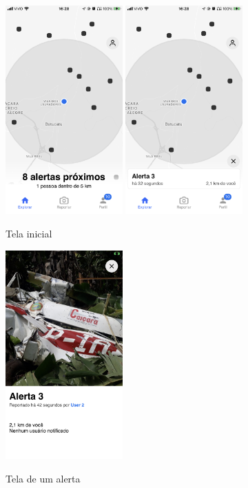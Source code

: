 \begin{figure}[htbp]
	\caption{\small Tela inicial} 
	\begin{center}
		\includegraphics[height=8cm]{images/lazarus-explorer-1.png} \quad
		\includegraphics[height=8cm]{images/lazarus-explorer-2.png}
	\end{center}
	\label{f.lazarus-explorer}
\end{figure}

\begin{figure}[htbp]
	\caption{\small Tela de um alerta} 
	\centering
	\includegraphics[height=8cm]{images/lazarus-incident.png}
	\label{f.lazarus-incident}
\end{figure}

